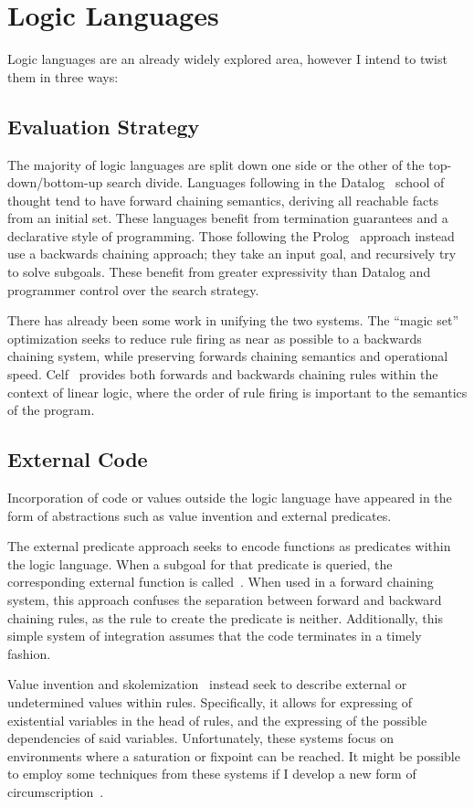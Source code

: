 \section{Logic Languages}
Logic languages are an already widely explored area, however I intend to twist them in three ways:
\subsection{Evaluation Strategy}
The majority of logic languages are split down one side or the other of the top-down/bottom-up search divide.
Languages following in the Datalog~\cite{datalog} school of thought tend to have forward chaining semantics, deriving all reachable facts from an initial set.
These languages benefit from termination guarantees and a declarative style of programming.
Those following the Prolog~\cite{prolog} approach instead use a backwards chaining approach;
they take an input goal, and recursively try to solve subgoals.
These benefit from greater expressivity than Datalog and programmer control over the search strategy.

There has already been some work in unifying the two systems.
The ``magic set''~\cite{magicset} optimization seeks to reduce rule firing as near as possible to a backwards chaining system, while preserving forwards chaining semantics and operational speed.
Celf~\cite{celf} provides both forwards and backwards chaining rules within the context of linear logic, where the order of rule firing is important to the semantics of the program.
\subsection{External Code}
Incorporation of code or values outside the logic language have appeared in the form of abstractions such as value invention and external predicates.

The external predicate approach seeks to encode functions as predicates within the logic language.
When a subgoal for that predicate is queried, the corresponding external function is called~\cite{gnuprolog}.
When used in a forward chaining system, this approach confuses the separation between forward and backward chaining rules, as the rule to create the predicate is neither.
Additionally, this simple system of integration assumes that the code terminates in a timely fashion.

Value invention and skolemization~\cite{Calimeri2007a,Bry2010a} instead seek to describe external or undetermined values within rules.
Specifically, it allows for expressing of existential variables in the head of rules, and the expressing of the possible dependencies of said variables.
Unfortunately, these systems focus on environments where a saturation or fixpoint can be reached.
It might be possible to employ some techniques from these systems if I develop a new form of circumscription~\cite{circumscription}.

